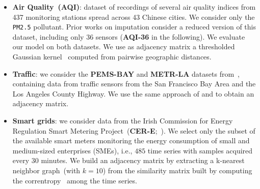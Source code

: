 \documentclass{article} \usepackage{iclr2022_conference,times}
\begin{document}
\begin{itemize}
    \item \textbf{Air Quality~(AQI)}: dataset of recordings of several air quality indices from 437 monitoring stations spread across 43 Chinese cities. We consider only the \texttt{PM2.5} pollutant. Prior works on imputation \citep{yi2016stmvl, cao2018brits} consider a reduced version of this dataset, including only 36 sensors (\textbf{AQI-36} in the following). We evaluate our model on both datasets. We use as adjacency matrix a thresholded Gaussian kernel~\citep{shuman2013emerging} computed from pairwise geographic distances.
    \item \textbf{Traffic}: we consider the \textbf{PEMS-BAY} and \textbf{METR-LA} datasets from~\citet{li2018diffusion}, containing data from traffic sensors from the San Francisco Bay Area and the Los Angeles County Highway. We use the same approach of \citet{li2018diffusion} and \citet{wu2019graph} to obtain an adjacency matrix.
    \item \textbf{Smart grids}: we consider data from the Irish Commission for Energy Regulation Smart Metering Project~(\textbf{CER-E};~\citealp{cer2016cer}). We select only the subset of the available smart meters monitoring the energy consumption of small and medium-sized enterprises (SMEs), i.e., $485$ time series with samples acquired every $30$ minutes. We build an adjacency matrix by extracting a k-nearest neighbor graph~(with $k=10$) from the similarity matrix built by computing the correntropy~\citep{liu2007correntropy} among the time series.
\end{itemize}
\end{document}
